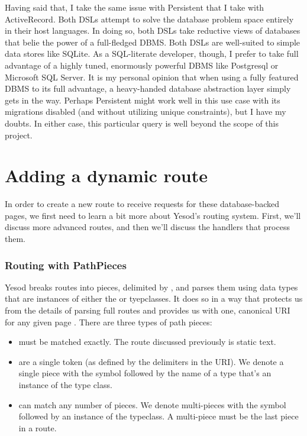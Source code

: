 Having said that, I take the same issue with Persistent that I take with ActiveRecord. Both DSLs attempt to solve the database problem space entirely in their host languages. In doing so, both DSLs take reductive views of databases that belie the power of a full-fledged DBMS. Both DSLs are well-suited to simple data stores like SQLite. As a SQL-literate developer, though, I prefer to take full advantage of a highly tuned, enormously powerful DBMS like Postgresql or Microsoft SQL Server. It is my personal opinion that when using a fully featured DBMS to its full advantage, a heavy-handed database abstraction layer simply gets in the way. Perhaps Persistent might work well in this use case with its migrations disabled (and without utilizing unique constraints), but I have my doubts. In either case, this particular query is well beyond the scope of this project.

\section{Adding a dynamic route}

In order to create a new route to receive requests for these database-backed pages, we first need to learn a bit more about Yesod's routing system. First, we'll discuss more advanced routes, and then we'll discuss the handlers that process them.

\subsubsection{Routing with PathPieces}

Yesod breaks routes into pieces, delimited by \code{/}, and parses them using data types that are instances of either the  or  tyepclasses. It does so in a way that protects us from the details of parsing full routes and provides us with one, canonical URI for any given page \cite{ybkRouting}. There are three types of path pieces:

\begin{itemize}
  \item {} must be matched exactly. The  route discussed previously is static text.
  \item {} are a single token (as defined by the \code{/} delimiters in the URI). We denote a single piece with the \code{\#} symbol followed by the name of a type that's an instance of the  type class.
  \item {} can match any number of pieces. We denote multi-pieces with the \code{*} symbol followed by an instance of the  typeclass. A multi-piece must be the last piece in a route.
\end{itemize}

